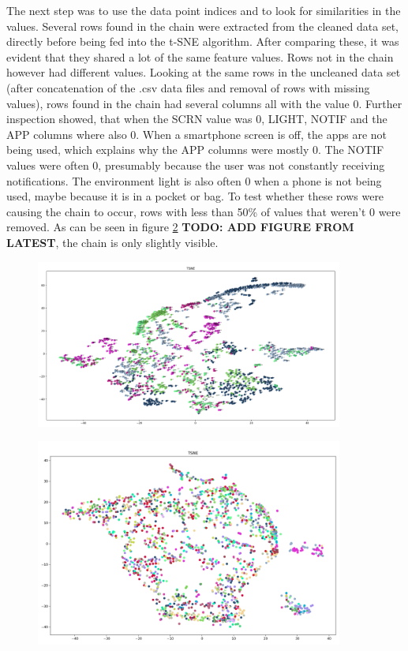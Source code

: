 The next step was to use the data point indices and to look for similarities in the values. Several rows found in the chain were extracted from the cleaned data set, directly before being fed into the t-SNE algorithm. After comparing these, it was evident that they shared a lot of the same feature values. Rows not in the chain however had different values. Looking at the same rows in the uncleaned data set (after concatenation of the .csv data files and removal of rows with missing values), rows found in the chain had several columns all with the value 0. Further inspection showed, that when the SCRN value was 0, LIGHT, NOTIF and the APP columns where also 0. When a smartphone screen is off, the apps are not being used, which explains why the APP columns were mostly 0. The NOTIF values were often 0, presumably because the user was not constantly receiving notifications. The environment light is also often 0 when a phone is not being used, maybe because it is in a pocket or bag. To test whether these rows were causing the chain to occur, rows with less than 50\% of values that weren't 0 were removed. As can be seen in figure \ref{figure:tsneAfterChainRemoved} \textbf{TODO: ADD FIGURE FROM LATEST}, the chain is only slightly visible.


\begin{figure}[h]
  \centering
  \includegraphics[width=0.9\textwidth]{./images/tsneTestSubjectsColor.png}
  \caption{}
  \label{figure:tsneTestSubjectsColor}
\end{figure}

\begin{figure}[h]
  \centering
  \includegraphics[width=0.9\textwidth]{./images/tsneAfterChainRemoved.png}
  \caption{}
  \label{figure:tsneAfterChainRemoved}
\end{figure}

